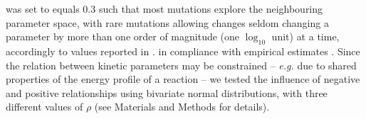 \documentclass[11pt,onecolumn]{article}
\providecommand{\DIFadd}[1]{{\protect\color{blue} \sf #1}} %
\providecommand{\DIFdel}[1]{{\protect\color{red} \scriptsize #1}} %
\providecommand{\DIFaddbegin}{} %
\providecommand{\DIFaddend}{} %
\providecommand{\DIFdelbegin}{} %
\providecommand{\DIFdelend}{} %
\begin{document}
\DIFdel{was set to }\DIFdelend \DIFaddbegin \DIFadd{equals }\DIFaddend $0.3$ such that most mutations explore the neighbouring parameter space,  \DIFdelbegin \DIFdel{with rare mutations allowing changes }\DIFdelend \DIFaddbegin \DIFadd{seldom changing a parameter }\DIFaddend by more than one order of magnitude (one $\log_{10}$ unit) \DIFdelbegin \DIFdel{at a time, accordingly to values reported in \citep{Carlin16}. 
}\DIFdelend \DIFaddbegin \DIFadd{in compliance with empirical estimates \citep{Carlin16}. Since the relation between kinetic parameters may be constrained -- \textit{e.g.} due to shared properties of the energy profile of a reaction -- we tested the influence of negative and positive relationships using bivariate normal distributions, with three different values of $\rho$ (see Materials and Methods for details). 
}\DIFaddend 
\end{document}
